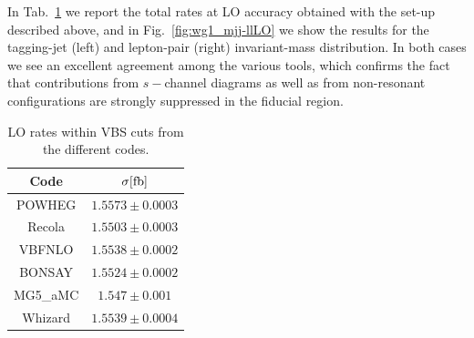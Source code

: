 In Tab.~\ref{tab:wg1_LOrates} we report the total rates at LO accuracy obtained with the set-up described above, and in Fig.~\ref{fig:wg1_mjj-llLO} we show the results
for the tagging-jet (left) and lepton-pair (right) invariant-mass distribution. In both cases we see an excellent agreement among the various tools, which confirms the fact
that contributions from $s-$channel diagrams as well as from non-resonant configurations are strongly suppressed in the fiducial region.
\begin{table}[h!]
    \centering
    \begin{tabular}{c|c}
        Code  &  $\sigma[\rm{fb}]$  \\
        \hline
        \hline
        {\sc POWHEG}  &  $1.5573 \pm 0.0003$ \\
        {\sc Recola}\+{\sc MoCaNLO}  &  $1.5503 \pm 0.0003$ \\
        {\sc VBFNLO}  &  $1.5538 \pm 0.0002$ \\
        {\sc BONSAY}  &  $1.5524 \pm 0.0002$ \\
        {\sc MG5\_aMC}&  $1.547 \pm 0.001$  \\ 
        {\sc Whizard}&  $ 1.5539 \pm 0.0004 $   
    \end{tabular}
    \caption{\label{tab:wg1_LOrates} LO rates within VBS cuts from the different codes.}
\end{table}
%
